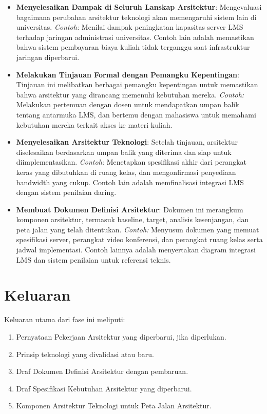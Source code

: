 \begin{itemize}
	\item \textbf{Menyelesaikan Dampak di Seluruh Lanskap Arsitektur}: Mengevaluasi bagaimana perubahan arsitektur teknologi akan memengaruhi sistem lain di universitas. \emph{Contoh:} Menilai dampak peningkatan kapasitas server LMS terhadap jaringan administrasi universitas. Contoh lain adalah memastikan bahwa sistem pembayaran biaya kuliah tidak terganggu saat infrastruktur jaringan diperbarui.
	
	\item \textbf{Melakukan Tinjauan Formal dengan Pemangku Kepentingan}: Tinjauan ini melibatkan berbagai pemangku kepentingan untuk memastikan bahwa arsitektur yang dirancang memenuhi kebutuhan mereka. \emph{Contoh:} Melakukan pertemuan dengan dosen untuk mendapatkan umpan balik tentang antarmuka LMS, dan bertemu dengan mahasiswa untuk memahami kebutuhan mereka terkait akses ke materi kuliah. 
	
	\item \textbf{Menyelesaikan Arsitektur Teknologi}: Setelah tinjauan, arsitektur diselesaikan berdasarkan umpan balik yang diterima dan siap untuk diimplementasikan. \emph{Contoh:} Menetapkan spesifikasi akhir dari perangkat keras yang dibutuhkan di ruang kelas, dan mengonfirmasi penyediaan bandwidth yang cukup. Contoh lain adalah memfinalisasi integrasi LMS dengan sistem penilaian daring.
	
	\item \textbf{Membuat Dokumen Definisi Arsitektur}: Dokumen ini merangkum komponen arsitektur, termasuk baseline, target, analisis kesenjangan, dan peta jalan yang telah ditentukan. \emph{Contoh:} Menyusun dokumen yang memuat spesifikasi server, perangkat video konferensi, dan perangkat ruang kelas serta jadwal implementasi. Contoh lainnya adalah menyertakan diagram integrasi LMS dan sistem penilaian untuk referensi teknis.
\end{itemize}


\section{Keluaran}
Keluaran utama dari fase ini meliputi:
\begin{enumerate}
	\item Pernyataan Pekerjaan Arsitektur yang diperbarui, jika diperlukan.
	\item Prinsip teknologi yang divalidasi atau baru.
	\item Draf Dokumen Definisi Arsitektur dengan pembaruan.
	\item Draf Spesifikasi Kebutuhan Arsitektur yang diperbarui.
	\item Komponen Arsitektur Teknologi untuk Peta Jalan Arsitektur.
\end{enumerate}

